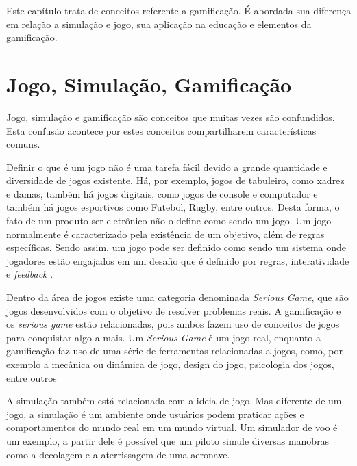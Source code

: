 \documentclass[
	12pt,				%
	oneside,			%
	a4paper,			%
	english,			%
	french,				%
	spanish,			%
	brazil,				%
	]{abntex2}
\begin{document}
Este capítulo trata de conceitos referente a gamificação. É abordada sua diferença em relação a simulação e jogo, sua aplicação na educação e elementos da gamificação.

\section{Jogo, Simulação, Gamificação}

Jogo, simulação e gamificação são conceitos que muitas vezes são confundidos. Esta confusão acontece por estes conceitos compartilharem características comuns.

Definir o que é um jogo não é uma tarefa fácil devido a grande quantidade e diversidade de jogos existente. Há, por exemplo, jogos de tabuleiro, como xadrez e damas, também há jogos digitais, como jogos de console e computador e também há jogos esportivos como Futebol, Rugby, entre outros. Desta forma, o fato de um produto ser eletrônico não o define como sendo um jogo. Um jogo normalmente é caracterizado pela existência de um objetivo, além de regras específicas. Sendo assim, um jogo pode ser definido como sendo um sistema onde jogadores estão engajados em um desafio que é definido por regras, interatividade e \textit{feedback} \cite{kaap:2014}. 

Dentro da área de jogos existe uma categoria denominada \textit{Serious Game}, que são jogos desenvolvidos com o objetivo de resolver problemas reais. A gamificação e os \textit{serious game} estão relacionadas, pois ambos fazem uso de conceitos de jogos para conquistar algo a mais. Um \textit{Serious Game} é um jogo real, enquanto a gamificação faz uso de uma série de ferramentas relacionadas a jogos, como, por exemplo a mecânica ou dinâmica de jogo, design do jogo, psicologia dos jogos, entre outros \cite{dorling2012software}

A simulação também está relacionada com a ideia de jogo. Mas diferente de um jogo, a simulação é um ambiente onde usuários podem praticar ações e comportamentos do mundo real em um mundo virtual. Um simulador de voo é um exemplo, a partir dele é possível que um piloto simule diversas manobras como a decolagem e a aterrissagem de uma aeronave.
\end{document}
